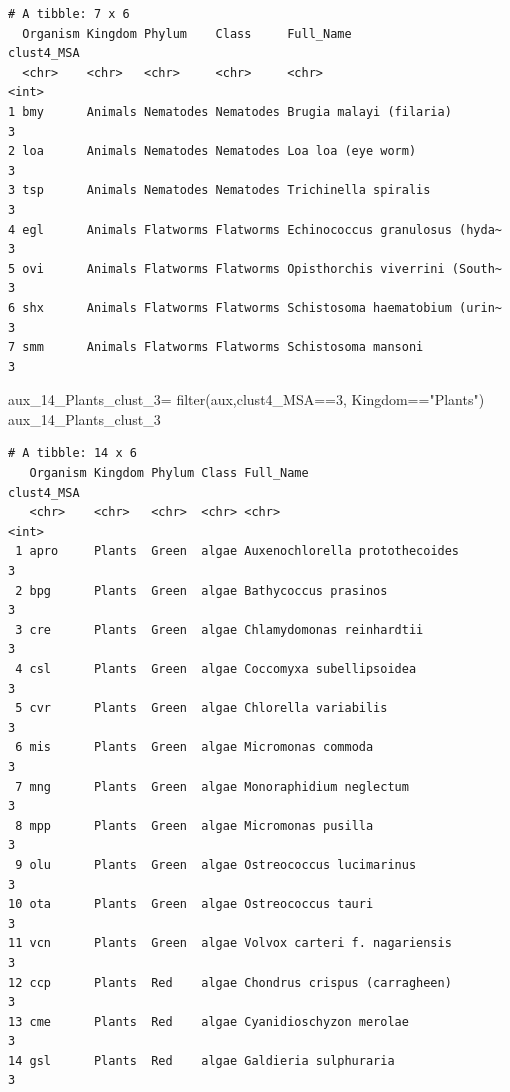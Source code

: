 \documentclass[
  letterpaper,
  DIV=11,
  numbers=noendperiod]{scrreprt}
\newenvironment{Shaded}{}{}
\newcommand{\DecValTok}[1]{\textcolor[rgb]{0.82,0.60,0.40}{#1}}
\newcommand{\FunctionTok}[1]{\textcolor[rgb]{0.38,0.69,0.94}{#1}}
\newcommand{\NormalTok}[1]{\textcolor[rgb]{0.67,0.70,0.75}{#1}}
\newcommand{\OtherTok}[1]{\textcolor[rgb]{0.15,0.68,0.38}{#1}}
\newcommand{\SpecialCharTok}[1]{\textcolor[rgb]{0.34,0.71,0.76}{#1}}
\newcommand{\StringTok}[1]{\textcolor[rgb]{0.60,0.76,0.47}{#1}}
\begin{document}
\begin{verbatim}
# A tibble: 7 x 6
  Organism Kingdom Phylum    Class     Full_Name                      clust4_MSA
  <chr>    <chr>   <chr>     <chr>     <chr>                               <int>
1 bmy      Animals Nematodes Nematodes Brugia malayi (filaria)                 3
2 loa      Animals Nematodes Nematodes Loa loa (eye worm)                      3
3 tsp      Animals Nematodes Nematodes Trichinella spiralis                    3
4 egl      Animals Flatworms Flatworms Echinococcus granulosus (hyda~          3
5 ovi      Animals Flatworms Flatworms Opisthorchis viverrini (South~          3
6 shx      Animals Flatworms Flatworms Schistosoma haematobium (urin~          3
7 smm      Animals Flatworms Flatworms Schistosoma mansoni                     3
\end{verbatim}

\begin{Shaded}
\begin{Highlighting}[]
\NormalTok{aux\_14\_Plants\_clust\_3}\OtherTok{=} \FunctionTok{filter}\NormalTok{(aux,clust4\_MSA}\SpecialCharTok{==}\DecValTok{3}\NormalTok{,}
\NormalTok{                             Kingdom}\SpecialCharTok{==}\StringTok{"Plants"}\NormalTok{)}
\NormalTok{aux\_14\_Plants\_clust\_3}
\end{Highlighting}
\end{Shaded}

\begin{verbatim}
# A tibble: 14 x 6
   Organism Kingdom Phylum Class Full_Name                      clust4_MSA
   <chr>    <chr>   <chr>  <chr> <chr>                               <int>
 1 apro     Plants  Green  algae Auxenochlorella protothecoides          3
 2 bpg      Plants  Green  algae Bathycoccus prasinos                    3
 3 cre      Plants  Green  algae Chlamydomonas reinhardtii               3
 4 csl      Plants  Green  algae Coccomyxa subellipsoidea                3
 5 cvr      Plants  Green  algae Chlorella variabilis                    3
 6 mis      Plants  Green  algae Micromonas commoda                      3
 7 mng      Plants  Green  algae Monoraphidium neglectum                 3
 8 mpp      Plants  Green  algae Micromonas pusilla                      3
 9 olu      Plants  Green  algae Ostreococcus lucimarinus                3
10 ota      Plants  Green  algae Ostreococcus tauri                      3
11 vcn      Plants  Green  algae Volvox carteri f. nagariensis           3
12 ccp      Plants  Red    algae Chondrus crispus (carragheen)           3
13 cme      Plants  Red    algae Cyanidioschyzon merolae                 3
14 gsl      Plants  Red    algae Galdieria sulphuraria                   3
\end{verbatim}
\end{document}

